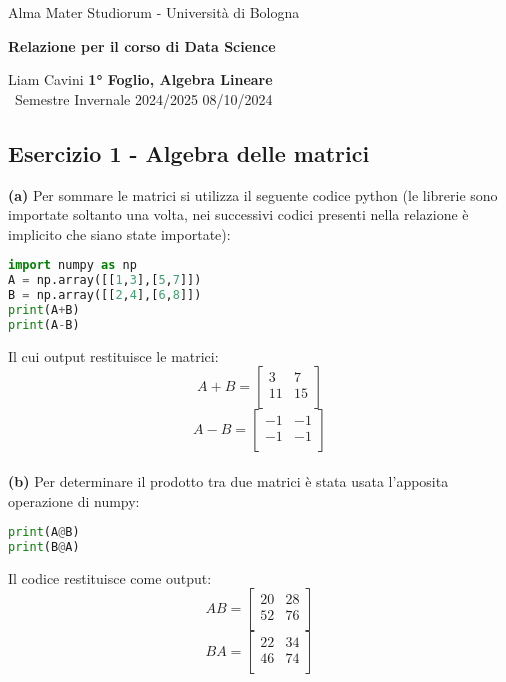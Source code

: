 \documentclass{article}
\begin{document}
\begin{center}
    {\Large Alma Mater Studiorum - Università di Bologna}
    
    \vspace{0.5cm}
    {\bf \large Relazione per il corso di Data Science}
\end{center} 

\noindent
{Liam Cavini} \hfill {\bf 1° Foglio, Algebra Lineare}\\
{\ Semestre Invernale 2024/2025} \hfill 08/10/2024



\subsection*{Esercizio 1 - Algebra delle matrici}
\textbf{(a)} 
Per sommare le matrici si utilizza il seguente codice python (le librerie sono importate soltanto una volta, nei successivi codici presenti nella relazione è implicito che siano state importate):
\begin{lstlisting}[language = Python]
import numpy as np
A = np.array([[1,3],[5,7]])
B = np.array([[2,4],[6,8]])
print(A+B)
print(A-B)  
\end{lstlisting} Il cui output restituisce le matrici:
\[ 
A + B =
    \begin{bmatrix}
        3 & 7  \\
        11 &  15 \\
    \end{bmatrix}
\]
\[
A - B = \begin{bmatrix}
        -1 & -1  \\
        -1 &  -1 \\
    \end{bmatrix}
\]
\\
\textbf{(b)}
Per determinare il prodotto tra due matrici è stata usata l'apposita operazione di numpy:
\begin{lstlisting}[language = Python]
print(A@B)
print(B@A)
\end{lstlisting}
Il codice restituisce come output:
\[
AB = 
\begin{bmatrix}
        20 & 28  \\
        52 & 76 \\
    \end{bmatrix}
\]
\[
BA =
\begin{bmatrix}
    22 & 34 \\
    46 & 74 \\
\end{bmatrix}
\]
\end{document}
